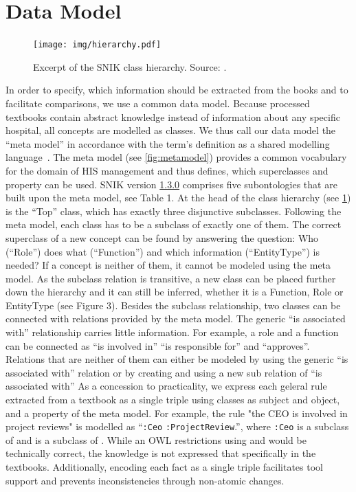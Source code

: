 \documentclass[conference]{IEEEtran}
\newcommand{\citep}{\cite}%
\newcommand{\snikversion}{1.3.0}
\newcommand{\snikversionlink}{\href{https://github.com/snikproject/ontology/releases/tag/\snikversion}{\snikversion}}
\begin{document}
\section{Data Model}
\begin{figure}[h]
    \centering
    \texttt{[image: img/hierarchy.pdf]}
    \caption{Excerpt of the SNIK class hierarchy. Source: \cite{snikposter}.}
	\label{fig:hierarchy}
\end{figure}
\vspace{-3pt}
In order to specify, which information should be extracted from the books and to facilitate comparisons, we use a common data model.
Because processed textbooks contain abstract knowledge instead of information about any specific hospital, all concepts are modelled as classes.
We thus call our data model the \enquote{meta model} in accordance with the term's definition as a shared modelling language~\citep[p.~8]{ob}.
The meta model (see \cref{fig:metamodel}) provides a common vocabulary for the domain of HIS management and thus defines, which superclasses and property can be used.
SNIK version \snikversionlink{} comprises five subontologies that are built upon the meta model, see Table 1.
At the head of the class hierarchy (see \cref{fig:hierarchy}) is the \enquote{Top} class, which has exactly three disjunctive subclasses.
%
Following the meta model, each class has to be a subclass of exactly one of them.
The correct superclass of a new concept can be found by answering the question: Who (\enquote{Role}) does what (\enquote{Function}) and which information (\enquote{EntityType}) is needed? If a concept is neither of them, it cannot be modeled using the meta model.
As the subclass relation is transitive, a new class can be placed further down the hierarchy and it can still be inferred, whether it is a Function, Role or EntityType (see Figure 3).
Besides the subclass relationship, two classes can be connected with relations provided by the meta model.
The generic \enquote{is associated with} relationship carries little information.
For example, a role and a function can be connected as \enquote{is involved in} \enquote{is responsible for} and \enquote{approves}.
Relations that are neither of them can either be modeled by using the generic \enquote{is associated with} relation or by creating and using a new sub relation of \enquote{is associated with}
%
As a concession to practicality, we express each geleral rule extracted from a textbook as a single triple using classes as subject and object, and a property of the meta model.
For example, the rule "the CEO is involved in project reviews" is modelled as \enquote{\texttt{:Ceo}  \texttt{:ProjectReview}.}, where \texttt{:Ceo} is a subclass of  and  is a subclass of .
While an OWL restrictions using  and  would be technically correct, the knowledge is not expressed that specifically in the textbooks.
Additionally, encoding each fact as a single triple facilitates tool support and prevents inconsistencies through non-atomic changes.
\end{document}
